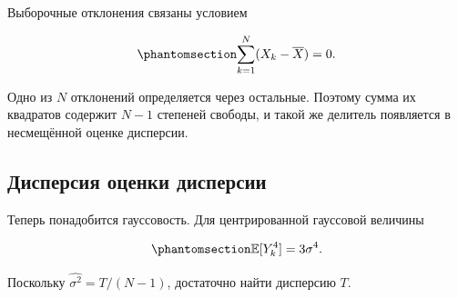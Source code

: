 \documentclass[
  russian,
  11pt,
  a4paper,
  open=any]{scrbook}
\begin{document}
Выборочные отклонения связаны условием

\begin{equation}\protect\phantomsection\label{eq-ch6-residuals-constraint}{
\sum_{k=1}^{N}(X_k-\overline X)=0.
}\end{equation}

Одно из \(N\) отклонений определяется через остальные. Поэтому сумма их
квадратов содержит \(N-1\) степеней свободы, и такой же делитель
появляется в несмещённой оценке дисперсии.

\subsection{Дисперсия оценки
дисперсии}\label{ux434ux438ux441ux43fux435ux440ux441ux438ux44f-ux43eux446ux435ux43dux43aux438-ux434ux438ux441ux43fux435ux440ux441ux438ux438}

Теперь понадобится гауссовость. Для центрированной гауссовой величины

\begin{equation}\protect\phantomsection\label{eq-ch6-gaussian-fourth-moment}{
\mathbb E[Y_k^4]=3\sigma^4.
}\end{equation}

Поскольку \(\widehat{\sigma^2}=T/(N-1)\), достаточно найти дисперсию
\(T\).
\end{document}
